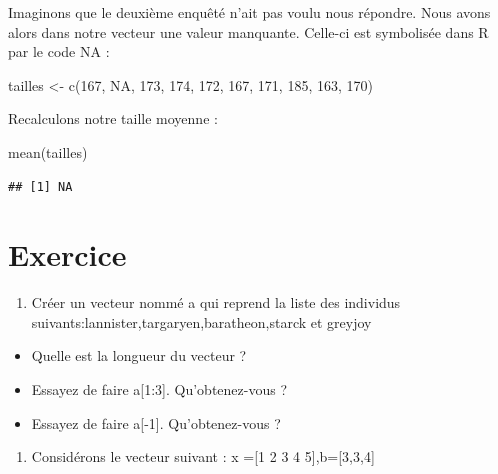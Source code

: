 \documentclass[
]{book}
\newenvironment{Shaded}{\begin{snugshade}}{\end{snugshade}}
\newcommand{\ConstantTok}[1]{\textcolor[rgb]{0.00,0.00,0.00}{#1}}
\newcommand{\DecValTok}[1]{\textcolor[rgb]{0.00,0.00,0.81}{#1}}
\newcommand{\FunctionTok}[1]{\textcolor[rgb]{0.00,0.00,0.00}{#1}}
\newcommand{\NormalTok}[1]{#1}
\newcommand{\OtherTok}[1]{\textcolor[rgb]{0.56,0.35,0.01}{#1}}
\providecommand{\tightlist}{%
  \setlength{\itemsep}{0pt}\setlength{\parskip}{0pt}}
\begin{document}
Imaginons que le deuxième enquêté n'ait pas voulu nous répondre. Nous avons alors dans notre vecteur une valeur manquante. Celle-ci est symbolisée dans R par le code NA :

\begin{Shaded}
\begin{Highlighting}[]
\NormalTok{tailles }\OtherTok{\textless{}{-}} \FunctionTok{c}\NormalTok{(}\DecValTok{167}\NormalTok{, }\ConstantTok{NA}\NormalTok{, }\DecValTok{173}\NormalTok{, }\DecValTok{174}\NormalTok{, }\DecValTok{172}\NormalTok{, }\DecValTok{167}\NormalTok{, }\DecValTok{171}\NormalTok{, }\DecValTok{185}\NormalTok{, }\DecValTok{163}\NormalTok{, }\DecValTok{170}\NormalTok{)}
\end{Highlighting}
\end{Shaded}

Recalculons notre taille moyenne :

\begin{Shaded}
\begin{Highlighting}[]
\FunctionTok{mean}\NormalTok{(tailles)}
\end{Highlighting}
\end{Shaded}

\begin{verbatim}
## [1] NA
\end{verbatim}

\hypertarget{exercice}{%
\section{Exercice}\label{exercice}}

\begin{enumerate}
\def\labelenumi{\arabic{enumi}.}
\tightlist
\item
  Créer un vecteur nommé a qui reprend la liste des individus suivants:lannister,targaryen,baratheon,starck et greyjoy
\end{enumerate}

\begin{itemize}
\tightlist
\item
  Quelle est la longueur du vecteur ?
\item
  Essayez de faire a{[}1:3{]}. Qu'obtenez-vous ?\\
\item
  Essayez de faire a{[}-1{]}. Qu'obtenez-vous ?
\end{itemize}

\begin{enumerate}
\def\labelenumi{\arabic{enumi}.}
\setcounter{enumi}{1}
\tightlist
\item
  Considérons le vecteur suivant : x ={[}1 2 3 4 5{]},b={[}3,3,4{]}
\end{enumerate}
\end{document}
